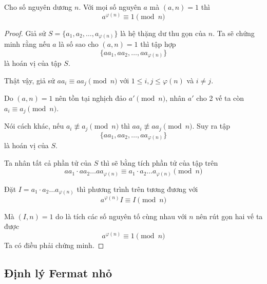 \begin{theorem}    
    Cho số nguyên dương $n$. Với mọi số nguyên $a$ mà $(a, n) = 1$ thì 
    \begin{equation}
        a^{\varphi(n)} \equiv 1 \pmod n
    \end{equation}
\end{theorem}

\begin{proof}
    Giả sử $S = \{a_1, a_2, \ldots, a_{\varphi(n)}\}$ là hệ thặng dư thu gọn của $n$. Ta sẽ chứng minh rằng nếu $a$ là số sao cho $(a, n)=1$ thì tập hợp
    \begin{equation*}
        \{a a_1, a a_2, \ldots, a a_{\varphi(n)}\}
    \end{equation*}
    là hoán vị của tập $S$.

    Thật vậy, giả sử $a a_i \equiv a a_j \pmod n$ với $1 \leqslant i, j \leqslant \varphi(n)$ và $i \neq j$.

    Do $(a, n) = 1$ nên tồn tại nghịch đảo $a' \pmod n$, nhân $a'$ cho 2 vế ta còn $a_i \equiv a_j \pmod n$.

    Nói cách khác, nếu $a_i \not\equiv a_j \pmod n$ thì $a a_i \not\equiv a a_j \pmod n$. Suy ra tập
    \begin{equation*}
        \{a a_1, a a_2, \ldots, a a_{\varphi(n)}\}
    \end{equation*}
    là hoán vị của $S$.

    Ta nhân tất cả phần tử của $S$ thì sẽ bằng tích phần tử của tập trên
    \begin{equation*}
        a a_1 \cdot a a_2 \ldots a a_{\varphi(n)} \equiv a_1 \cdot a_2 \ldots a_{\varphi(n)} \pmod n
    \end{equation*}

    Đặt $I = a_1 \cdot a_2 \ldots a_{\varphi(n)}$ thì phương trình trên tương đương với 
    \begin{equation*}
        a^{\varphi(n)} I \equiv I \pmod n
    \end{equation*}
    
    Mà $(I, n) = 1$ do là tích các số nguyên tố cùng nhau với $n$ nên rút gọn hai vế ta được
    \begin{equation*}
        a^{\varphi(n)} \equiv 1 \pmod n
    \end{equation*}
    Ta có điều phải chứng minh.
\end{proof}

\subsection*{Định lý Fermat nhỏ}

